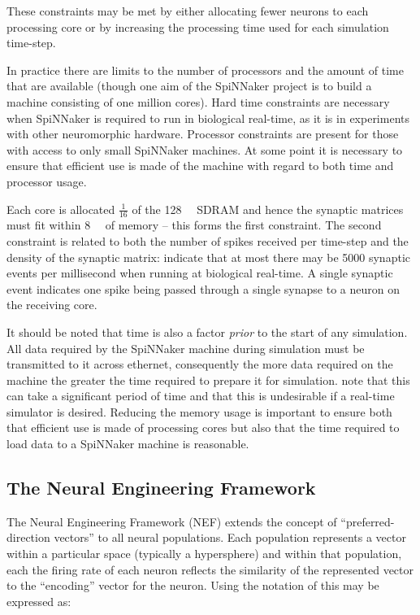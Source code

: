 \documentclass[conference]{IEEEtran}
\begin{document}
These constraints may be met by either allocating fewer neurons to each processing core or by increasing the processing time used for each simulation time-step.

In practice there are limits to the number of processors and the amount of time that are available (though one aim of the SpiNNaker project is to build a machine consisting of one million cores).
Hard time constraints are necessary when SpiNNaker is required to run in biological real-time, as it is in experiments with other neuromorphic hardware.
Processor constraints are present for those with access to only small SpiNNaker machines.
At some point it is necessary to ensure that efficient use is made of the machine with regard to both time and processor usage.

Each core is allocated $\frac{1}{16}$ of the \SI{128}{\mebi\byte} SDRAM and hence the synaptic matrices must fit within \SI{8}{\mebi\byte} of memory -- this forms the first constraint.
The second constraint is related to both the number of spikes received per time-step and the density of the synaptic matrix: \textcite[\S III.C]{Sharp2013} indicate that at most there may be \num{5000} synaptic events per millisecond when running at biological real-time.
A single synaptic event indicates one spike being passed through a single synapse to a neuron on the receiving core.

It should be noted that time is also a factor \textit{prior} to the start of any simulation.
All data required by the SpiNNaker machine during simulation must be transmitted to it across ethernet, consequently the more data required on the machine the greater the time required to prepare it for simulation.
\textcite{Sharp2013} note that this can take a significant period of time and that this is undesirable if a real-time simulator is desired.
Reducing the memory usage is important to ensure both that efficient use is made of processing cores but also that the time required to load data to a SpiNNaker machine is reasonable.

  \subsection{The Neural Engineering Framework}
  \label{sef:background/nef}

The Neural Engineering Framework (NEF) extends the concept of ``preferred-direction vectors'' \parencite{} to all neural populations.
Each population represents a vector within a particular space (typically a hypersphere) and within that population, each the firing rate of each neuron reflects the similarity of the represented vector to the ``encoding'' vector for the neuron.
Using the notation of \textcite{Stewart2014} this may be expressed as:
\end{document}
